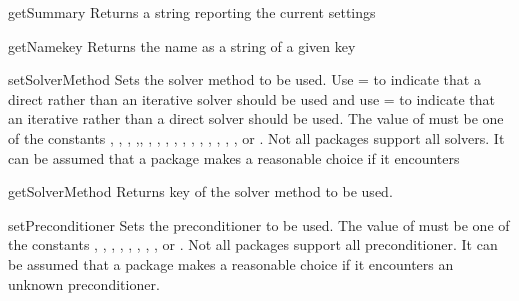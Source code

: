 \begin{methoddesc}[SolverOptions]{getSummary}{}
Returns a string reporting the current settings
\end{methoddesc}

\begin{methoddesc}[SolverOptions]{getName}{key}
Returns the name as a string of a given key
\end{methoddesc}

\begin{methoddesc}[SolverOptions]{setSolverMethod}{}
Sets the solver method to be used. Use = to indicate that a direct rather than an iterative solver should be used and use = to indicate that an iterative rather than a direct solver should be used. 
The value of  must be one of the constants
 , , , ,, , , , 
 , , , , , , , , 
 or .
Not all packages support all solvers. It can be assumed that a package makes a reasonable choice if it encounters
\end{methoddesc}

\begin{methoddesc}[SolverOptions]{getSolverMethod}{}
Returns key of the solver method to be used. 
\end{methoddesc}

\begin{methoddesc}[SolverOptions]{setPreconditioner}{}
Sets the preconditioner to be used. 
The value of  must be one of the constants
, , , , 
, , , , or
.
Not all packages support all preconditioner. It can be assumed that a package makes a reasonable choice if it encounters
an unknown preconditioner. 
\end{methoddesc}
   
